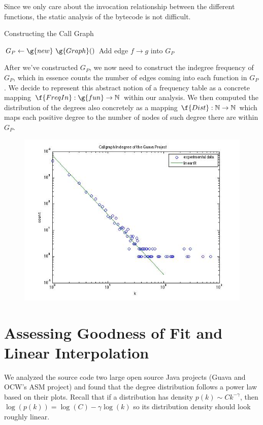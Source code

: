 \documentclass[11pt,a4paper]{article}
\begin{document}
Since we only care about the invocation relationship between the different 
functions, the static analysis of the bytecode is not difficult.
\begin{algorithm}
\caption{Constructing the Call Graph}
\begin{algorithmic}
\State $G_P \gets \g{new}~ \g{Graph}()$
\State Add edge $f \to g$ into $G_P$
\EndIf
\EndFor
\EndFor
\EndFunction
\end{algorithmic}
\end{algorithm}
After we've constructed $G_P$, we now need to construct the indegree frequency 
of $G_P$, which in essence counts the number of edges coming into each 
function in $G_P$. We decide to represent this abstract notion of a frequency 
table as a concrete mapping $\f{FreqIn}: \g{fun} \to \mathbb{N}$ within our 
analysis. We then computed the distribution of the degrees also concretely as 
a mapping $\f{Dist}: \mathbb{N} \to \mathbb{N}$ which maps each positive 
degree to the number of nodes of such degree there are within $G_P$.
\begin{figure}
\centering
\caption{}
\includegraphics[scale=0.6]{dist}
\end{figure}
\section*{Assessing Goodness of Fit and Linear Interpolation}
We analyzed the source code two large open source Java projects (Guava and 
OCW's ASM project) and found that the degree distribution follows a
power law based on their  plots. Recall that if a distribution has
density $p(k) \sim Ck^{-\gamma}$, then $\log(p(k)) = \log(C) - \gamma \log(k)$
so its distribution density should look roughly linear.
\end{document}
